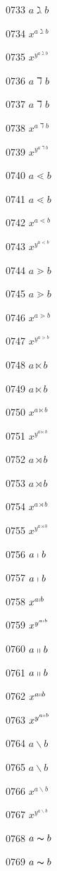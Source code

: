 \documentclass{article}
\begin{document}
0733 $\displaystyle a\gimel b$\par
0734 $x^{a\gimel b}$\par
0735 $x^{y^{a\gimel b}}$\par
0736 $a\daleth b$\par
0737 $\displaystyle a\daleth b$\par
0738 $x^{a\daleth b}$\par
0739 $x^{y^{a\daleth b}}$\par
0740 $a\lessdot b$\par
0741 $\displaystyle a\lessdot b$\par
0742 $x^{a\lessdot b}$\par
0743 $x^{y^{a\lessdot b}}$\par
0744 $a\gtrdot b$\par
0745 $\displaystyle a\gtrdot b$\par
0746 $x^{a\gtrdot b}$\par
0747 $x^{y^{a\gtrdot b}}$\par
0748 $a\ltimes b$\par
0749 $\displaystyle a\ltimes b$\par
0750 $x^{a\ltimes b}$\par
0751 $x^{y^{a\ltimes b}}$\par
0752 $a\rtimes b$\par
0753 $\displaystyle a\rtimes b$\par
0754 $x^{a\rtimes b}$\par
0755 $x^{y^{a\rtimes b}}$\par
0756 $a\shortmid b$\par
0757 $\displaystyle a\shortmid b$\par
0758 $x^{a\shortmid b}$\par
0759 $x^{y^{a\shortmid b}}$\par
0760 $a\shortparallel b$\par
0761 $\displaystyle a\shortparallel b$\par
0762 $x^{a\shortparallel b}$\par
0763 $x^{y^{a\shortparallel b}}$\par
0764 $a\smallsetminus b$\par
0765 $\displaystyle a\smallsetminus b$\par
0766 $x^{a\smallsetminus b}$\par
0767 $x^{y^{a\smallsetminus b}}$\par
0768 $a\thicksim b$\par
0769 $\displaystyle a\thicksim b$\par
\end{document}
